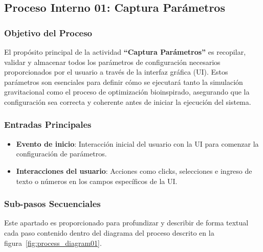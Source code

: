 \subsection{Proceso Interno 01: Captura Parámetros}

\subsubsection{Objetivo del Proceso}
El propósito principal de la actividad \textbf{``Captura Parámetros''} es recopilar, validar y almacenar todos los parámetros de configuración necesarios proporcionados por el usuario a través de la interfaz gráfica (UI). Estos parámetros son esenciales para definir cómo se ejecutará tanto la simulación gravitacional como el proceso de optimización bioinspirado, asegurando que la configuración sea correcta y coherente antes de iniciar la ejecución del sistema.

\subsubsection{Entradas Principales}
\begin{itemize}
    \item \textbf{Evento de inicio}: Interacción inicial del usuario con la UI para comenzar la configuración de parámetros.
    \item \textbf{Interacciones del usuario}: Acciones como clicks, selecciones e ingreso de texto o números en los campos específicos de la UI.\
\end{itemize}

\subsubsection{Sub-pasos Secuenciales}
Este apartado es proporcionado para profundizar y describir de forma textual cada paso contenido dentro del diagrama del proceso descrito en la figura~\ref{fig:process_diagram01}.
